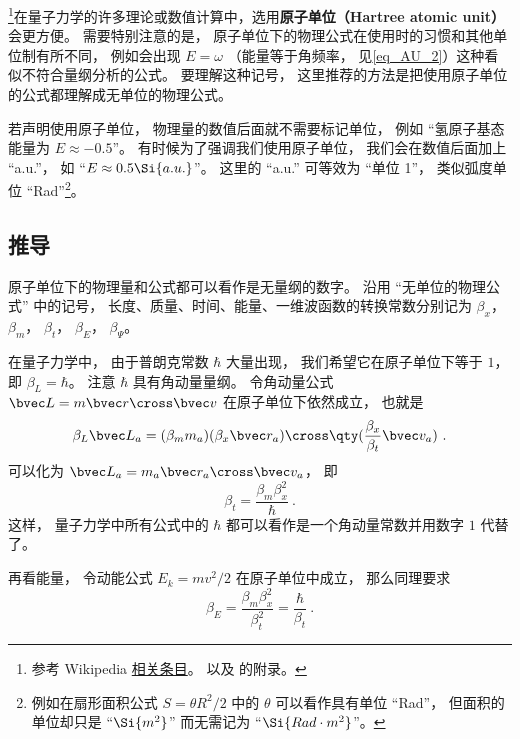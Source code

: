 

\footnote{参考 Wikipedia \href{https://en.wikipedia.org/wiki/Hartree_atomic_units}{相关条目}。 以及 \cite{Bransden} 的附录。}在量子力学的许多理论或数值计算中，选用\textbf{原子单位（Hartree atomic unit）}会更方便。 需要特别注意的是， 原子单位下的物理公式在使用时的习惯和其他单位制有所不同， 例如会出现 $E = \omega$ （能量等于角频率， 见\autoref{eq_AU_2}）这种看似不符合量纲分析的公式。 要理解这种记号， 这里推荐的方法是把使用原子单位的公式都理解成无单位的物理公式。


若声明使用原子单位， 物理量的数值后面就不需要标记单位， 例如 “氢原子基态能量为 $E \approx -0.5$”。 有时候为了强调我们使用原子单位， 我们会在数值后面加上 “a.u.”， 如 “$E \approx 0.5 \Si{a.u.}$”。 这里的 “a.u.” 可等效为 “单位 1”， 类似弧度单位 “Rad”\footnote{例如在扇形面积公式 $S = \theta R^2/2$ 中的 $\theta$ 可以看作具有单位 “Rad”， 但面积的单位却只是 “$\Si{m^2}$” 而无需记为 “$\Si{Rad\cdot m^2}$”。}。

\subsection{推导}\label{sub_AU_1}
原子单位下的物理量和公式都可以看作是无量纲的数字。 沿用 “无单位的物理公式” 中的记号， 长度、质量、时间、能量、一维波函数的转换常数分别记为 $\beta_x$， $\beta_m$， $\beta_t$， $\beta_E$， $\beta_\Psi$。

在量子力学中， 由于普朗克常数 $\hbar$ 大量出现， 我们希望它在原子单位下等于 $1$， 即 $\beta_L = \hbar$。 注意 $\hbar$ 具有角动量量纲。 令角动量公式 $\bvec L = m \bvec r \cross \bvec v$ 在原子单位下依然成立， 也就是
\begin{equation}
\beta_L\bvec L_a = (\beta_m m_a) (\beta_x \bvec r_a) \cross \qty(\frac{\beta_x}{\beta_t} \bvec v_a)~.
\end{equation}
可以化为 $\bvec L_a = m_a \bvec r_a \cross \bvec v_a$， 即
\begin{equation}\label{eq_AU_6}
\beta_t = \frac{\beta_m \beta_x^2}{\hbar}~.
\end{equation}
这样， 量子力学中所有公式中的 $\hbar$ 都可以看作是一个角动量常数并用数字 $1$ 代替了。

再看能量， 令动能公式 $E_k = mv^2/2$ 在原子单位中成立， 那么同理要求
\begin{equation}\label{eq_AU_7}
\beta_E = \frac{\beta_m \beta_x^2}{\beta_t^2} = \frac{\hbar}{\beta_t}~.
\end{equation}

